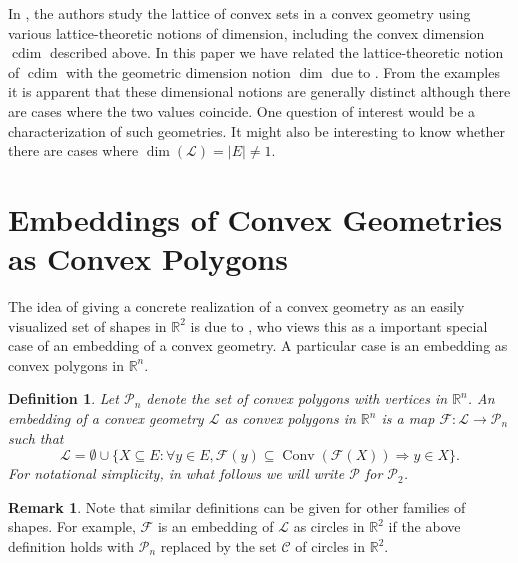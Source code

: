 \documentclass[12pt]{elsarticle}
\theoremstyle{plain}
\newtheorem{definition}{Definition}
\theoremstyle{definition}
\newtheorem{remark}{Remark}
\newcommand{\F}{\mathcal{F}}
\newcommand{\Poly}{\mathcal{P}}
\newcommand{\cgeom}{\mathcal{L}}
\DeclareMathOperator{\Hull}{Conv}
\DeclareMathOperator{\cdim}{cdim}
\begin{document}
In \cite{ES}, the authors study the lattice of convex sets in a convex geometry using various lattice-theoretic notions of dimension, including the convex dimension $\cdim$ described above. In this paper we have related the lattice-theoretic notion of $\cdim$ with the geometric dimension notion $\dim$ due to \cite{KNO}. From the examples it is apparent that these dimensional notions are generally distinct although there are cases where the two values coincide. One question of interest would be a characterization of such geometries.  It might also be interesting to know whether there are cases where $\dim(\cgeom)=|E|\neq1$.

\section{Embeddings of Convex Geometries as Convex Polygons}

The idea of giving a concrete realization of a convex geometry as an easily visualized set of shapes in $\mathbb{R}^2$ is due to \cite{C}, who views this as a important special case of an embedding of a convex geometry.  A particular case is an embedding as convex polygons in $\mathbb{R}^{n}$.

\begin{definition}
Let $\Poly_{n}$ denote the set of convex polygons with vertices in $\mathbb{R}^{n}$.  An embedding of a convex geometry $\cgeom$ as convex polygons in $\mathbb{R}^{n}$ is a map $\F:\cgeom\to\Poly_{n}$ such that 
\begin{equation}\label{defn:polycgeom}
\cgeom = \emptyset \cup \{X \subseteq E: \forall y \in E, \F(y) \subseteq \Hull(\F(X)) \Rightarrow y \in X\}.
\end{equation}
For notational simplicity, in what follows we will write $\Poly$ for $\Poly_{2}$.
\end{definition}
\begin{remark}
 Note that similar definitions can be given for other families of shapes.  For example, $\F$ is an embedding of $\cgeom$ as circles in $\mathbb{R}^{2}$ if the above definition holds with $\Poly_{n}$ replaced by the set $\mathcal{C}$ of circles in $\mathbb{R}^{2}$.
\end{remark}
\end{document}
